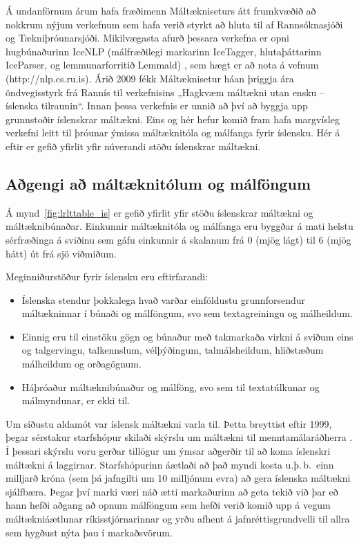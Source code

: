 \begin{multicols}{2}
Á undanförnum árum hafa fræðimenn Máltækniseturs átt frumkvæðið að nokkrum nýjum verkefnum sem hafa verið styrkt að hluta til af Rannsóknasjóði og Tækniþróunarsjóði. Mikilvægasta afurð þessara verkefna er opni hugbúnaðurinn IceNLP (málfræðilegi markarinn IceTagger, hlutaþáttarinn IceParser, og lemmunarforritið Lemmald) \cite{icenlp1}, sem hægt er að nota á vefnum (http://nlp.cs.ru.is). Árið 2009 fékk Máltæknisetur háan þriggja ára öndvegisstyrk frá Rannís til verkefnisins „Hagkvæm máltækni utan ensku -- íslenska tilraunin“. Innan þessa verkefnis er unnið að því að byggja upp grunnstoðir íslenskrar máltækni.
Eins og hér hefur komið fram hafa margvísleg verkefni leitt til þróunar ýmissa máltæknitóla og málfanga fyrir íslensku. Hér á eftir er gefið yfirlit yfir núverandi stöðu íslenskrar máltækni.

\subsection{Aðgengi að máltæknitólum og málföngum}

Á mynd~\ref{fig:lrlttable_is} er gefið yfirlit yfir stöðu íslenskrar máltækni og máltæknibúnaðar. Einkunnir máltæknitóla og málfanga eru byggðar á mati helstu sérfræðinga á sviðinu sem gáfu einkunnir á skalanum frá 0 (mjög lágt) til 6 (mjög hátt) út frá sjö viðmiðum.

Meginniðurstöður fyrir íslensku eru eftirfarandi:

\begin{itemize}
\item Íslenska stendur þokkalega hvað varðar einföldustu grunnforsendur máltækninnar í búnaði og málföngum, svo sem textagreiningu og málheildum.
\item Einnig eru til einstöku gögn og búnaður með takmarkaða virkni á sviðum eins og talgervingu, talkennslum, vélþýðingum, talmálsheildum, hliðstæðum málheildum og orðagögnum. 
\item Háþróaður máltæknibúnaður og málföng, svo sem til textatúlkunar og málmyndunar, er ekki til. 
\end{itemize}

Um síðustu aldamót var íslensk máltækni varla til. Þetta breyttist eftir 1999, þegar sérstakur starfshópur skilaði skýrslu um máltækni til menntamálaráðherra \cite{sky1}. Í þessari skýrslu voru gerðar tillögur um ýmsar aðgerðir til að koma íslenskri máltækni á laggirnar. Starfshópurinn áætlaði að það myndi kosta u.þ.\,b.~einn milljarð króna (sem þá jafngilti um 10 milljónum evra) að gera íslenska máltækni sjálfbæra. Þegar því marki væri náð ætti markaðurinn að geta tekið við þar eð hann hefði aðgang að opnum málföngum sem hefði verið komið upp á vegum máltækniáætlunar ríkisstjórnarinnar og yrðu afhent á jafnréttisgrundvelli til allra sem hygðust nýta þau í markaðsvörum.


\end{multicols}
